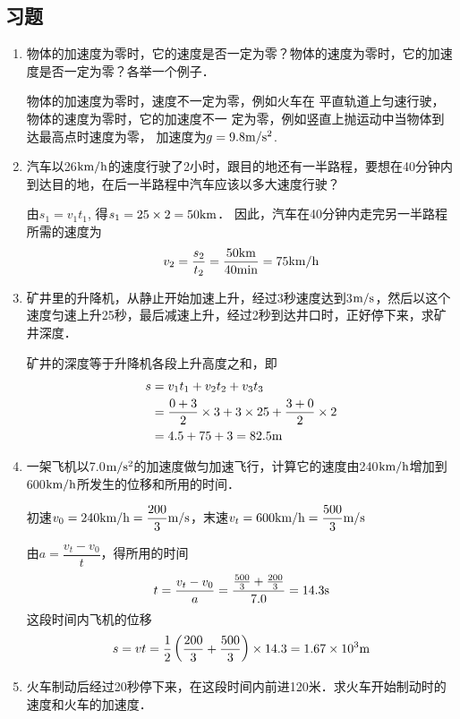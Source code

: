 \subsection{习题}
\begin{enumerate}
	\item 物体的加速度为零时，它的速度是否一定为零？物体的速度为零时，它的加速度是否一定为零？各举一个例子．

    \begin{solution}
        物体的加速度为零时，速度不一定为零，例如火车在
        平直轨道上匀速行驶，物体的速度为零时，它的加速度不一
        定为零，例如竖直上抛运动中当物体到达最高点时速度为零，
        加速度为$g=9.8\text{m}/\text{s}^2$.   
    \end{solution}
	\item 汽车以26$\text{km}/\text{h}$的速度行驶了2小时，跟目的地还有一半路程，要想在40分钟内到达目的地，在后一半路程中汽车应该以多大速度行驶？

    \begin{solution}
        由$s_1=v_1t_1$, 得$s_1=25\times2=50{\rm km}$．
        因此，汽车在40分钟内走完另一半路程所需的速度为
    \[v_2=\frac{s_2}{t_2}=\frac{50{\rm km}}{40{\rm min}}=75\text{km}/\text{h}\]    
    \end{solution}
	\item 矿井里的升降机，从静止开始加速上升，经过3秒速度达到3$\text{m}/\text{s}$，然后以这个速度匀速上升25秒，最后减速上升，经过2秒到达井口时，正好停下来，求矿井深度．

    \begin{solution}
        矿井的深度等于升降机各段上升高度之和，即
\[\begin{split}
     s&=v_1t_1+v_2t_2+v_3t_3\\
     &=\frac{0+3}{2}\times 3+3\times 25+\frac{3+0}{2}\times 2\\
     &=4.5+75+3=82.5{\rm m}
\end{split}\]
    \end{solution}
	\item 一架飞机以7.0$\text{m}/\text{s}^2$的加速度做匀加速飞行，计算它的速度由240$\text{km}/\text{h}$增加到600$\text{km}/\text{h}$所发生的位移和所用的时间．

    \begin{solution}
        初速$v_0=240\text{km}/\text{h}=\dfrac{200}{3}\text{m}/\text{s}$，末速$v_t=600\text{km}/\text{h}=\dfrac{500}{3}\text{m}/\text{s}$

由$a=\dfrac{v_t-v_0}{t}$，得所用的时间
\[t=\frac{v_t-v_0}{a}=\frac{\frac{500}{3}+\frac{200}{3}}{7.0}=14.3{\rm s}\]
这段时间内飞机的位移
\[s=vt=\frac{1}{2}\left(\frac{200}{3}+\frac{500}{3}\right)\times 14.3=1.67\times 10^3{\rm m}\]
    \end{solution}
	\item 火车制动后经过20秒停下来，在这段时间内前进120米．求火车开始制动时的速度和火车的加速度．


\end{enumerate}
